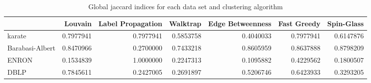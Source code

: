 \begin{table}[ht]
\centering
\begin{tabular}{lrrrrrr}
  \hline
 & Louvain & Label Propagation & Walktrap & Edge Betweenness & Fast Greedy & Spin-Glass \\
  \hline
karate & 0.7977941 & 0.7977941 & 0.5853758 & 0.4040033 & 0.7977941 & 0.6147876 \\
  Barabasi-Albert & 0.8470966 & 0.2700000 & 0.7433218 & 0.8605959 & 0.8637888 & 0.8798209 \\
  ENRON & 0.1534839 & 1.0000000 & 0.2247313 & 0.1095882 & 0.4229562 & 0.1800507 \\
  DBLP & 0.7845611 & 0.2427005 & 0.2691897 & 0.5206746 & 0.6423933 & 0.3293205 \\
   \hline
\end{tabular}
\caption{Global jaccard indices for each data set and clustering algorithm}
\label{tab:jaccard}
\end{table}
